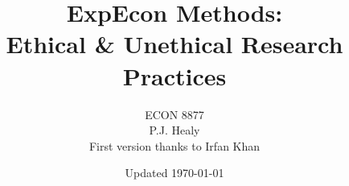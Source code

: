 

\title[Power and Ethics]{ExpEcon Methods:\\Ethical \& Unethical Research Practices}
\author[ECON 8877]{ECON 8877\\P.J. Healy\\First version thanks to Irfan Khan} \color{metrop}
\institute[OSU]{}
\date[]{\vfill {\tiny Updated \today}}




\frame{\maketitle}





